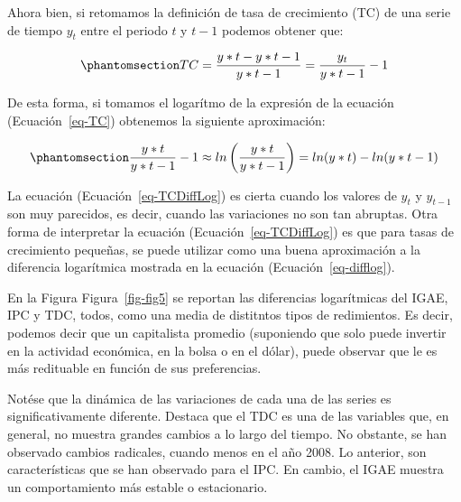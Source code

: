 \documentclass[
  a4paper,
]{article}
\begin{document}
Ahora bien, si retomamos la definición de tasa de crecimiento (TC) de
una serie de tiempo \(y_t\) entre el periodo \(t\) y \(t-1\) podemos
obtener que:

\begin{equation}\phantomsection\label{eq-TC}{
TC = \frac{y*t - y*{t-1}}{y*{t-1}} = \frac{y_t}{y*{t-1}} - 1
}\end{equation}

De esta forma, si tomamos el logarítmo de la expresión de la ecuación
(Ecuación~\ref{eq-TC}) obtenemos la siguiente aproximación:

\begin{equation}\phantomsection\label{eq-TCDiffLog}{
\frac{y*t}{y*{t-1}} -1 \approx ln \left( \frac{y*t}{y*{t-1}} \right) = ln(y*t) - ln(y*{t-1})
}\end{equation}

La ecuación (Ecuación~\ref{eq-TCDiffLog}) es cierta cuando los valores
de \(y_t\) y \(y_{t-1}\) son muy parecidos, es decir, cuando las
variaciones no son tan abruptas. Otra forma de interpretar la ecuación
(Ecuación~\ref{eq-TCDiffLog}) es que para tasas de crecimiento pequeñas,
se puede utilizar como una buena aproximación a la diferencia
logarítmica mostrada en la ecuación (Ecuación~\ref{eq-difflog}).

En la Figura Figura~\ref{fig-fig5} se reportan las diferencias
logarítmicas del IGAE, IPC y TDC, todos, como una media de distitntos
tipos de redimientos. Es decir, podemos decir que un capitalista
promedio (suponiendo que solo puede invertir en la actividad económica,
en la bolsa o en el dólar), puede observar que le es más redituable en
función de sus preferencias.

Notése que la dinámica de las variaciones de cada una de las series es
significativamente diferente. Destaca que el TDC es una de las variables
que, en general, no muestra grandes cambios a lo largo del tiempo. No
obstante, se han observado cambios radicales, cuando menos en el año
2008. Lo anterior, son características que se han observado para el IPC.
En cambio, el IGAE muestra un comportamiento más estable o estacionario.


\printbibliography
\end{document}
